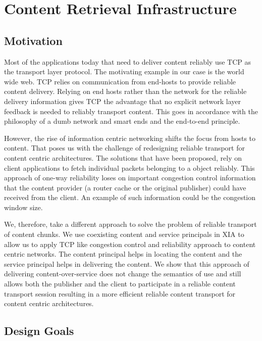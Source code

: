 \chapter{Content Retrieval Infrastructure}
\label{content_retrieval}

\section{Motivation}

Most of the applications today that need to deliver content reliably
use TCP as the transport layer protocol. The motivating example in our
case is the world wide web. TCP relies on communication from end-hosts
to provide reliable content delivery. Relying on end hosts rather than
the network for the reliable delivery information gives TCP the
advantage that no explicit network layer feedback is needed to
reliably transport content. This goes in accordance with the
philosophy of a dumb network and smart ends and the end-to-end
principle.

However, the rise of information centric networking shifts the focus
from hosts to content. That poses us with the challenge of redesigning
reliable transport for content centric architectures. The solutions
that have been proposed, rely on client applications to fetch
individual packets belonging to a object reliably. This approach of
one-way reliability loses on important congestion control information
that the content provider (a router cache or the original publisher)
could have received from the client. An example of such information
could be the congestion window size.

We, therefore, take a different approach to solve the problem of
reliable transport of content chunks. We use coexisting content and
service principals in XIA to allow us to apply TCP like congestion
control and reliability approach to content centric networks. The
content principal helps in locating the content and the service
principal helps in delivering the content. We show that this approach
of delivering content-over-service does not change the semantics of
use and still allows both the publisher and the client to
participate in a reliable content transport session resulting in a
more efficient reliable content transport for content centric
architectures.

\section{Design Goals}

